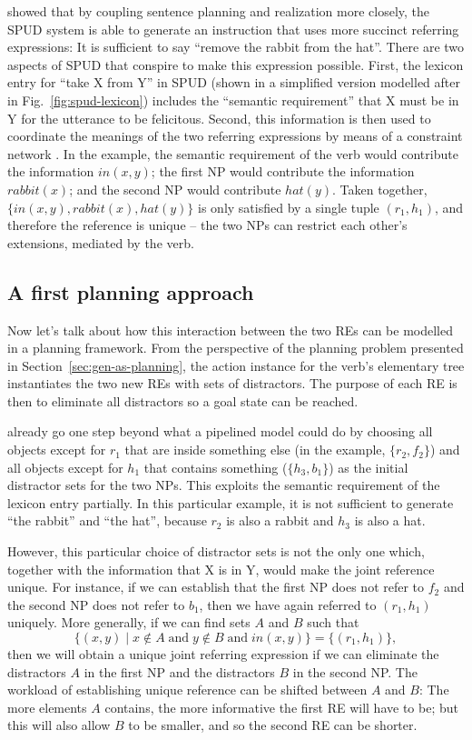  showed that by coupling sentence planning and
realization more closely, the SPUD system is able to generate an
instruction that uses more succinct referring expressions: It is
sufficient to say ``remove the rabbit from the hat''.  There are two
aspects of SPUD that conspire to make this expression possible.
First, the lexicon entry for ``take X from Y'' in SPUD (shown in a
simplified version modelled after  in
Fig.~\ref{fig:spud-lexicon}) includes the ``semantic requirement''
that X must be in Y for the utterance to be felicitous.  Second, this
information is then used to coordinate the meanings of the two
referring expressions by means of a constraint network
\cite{dale91:_gener_refer_expres_invol_relat}.  In the example, the
semantic requirement of the verb would contribute the information
$in(x,y)$; the first NP would contribute the information $rabbit(x)$;
and the second NP would contribute $hat(y)$.  Taken together,
$\{in(x,y), rabbit(x), hat(y)\}$ is only satisfied by a single tuple
$(r_1,h_1)$, and therefore the reference is unique -- the two NPs can
restrict each other's extensions, mediated by the verb.


\subsection{A first planning approach}

Now let's talk about how this interaction between the two REs can be
modelled in a planning framework.  From the perspective of the
planning problem presented in Section~\ref{sec:gen-as-planning}, the
action instance for the verb's elementary tree instantiates the two
new REs with sets of distractors.  The purpose of each RE is then to
eliminate all distractors so a goal state can be reached.

 already go one step beyond what a pipelined model
could do by choosing all objects except for $r_1$ that are inside
something else (in the example, $\{r_2,f_2\}$) and all objects except
for $h_1$ that contains something ($\{h_3,b_1\}$) as the initial
distractor sets for the two NPs.  This exploits the semantic
requirement of the lexicon entry partially.  In this particular
example, it is not sufficient to generate ``the rabbit'' and ``the
hat'', because $r_2$ is also a rabbit and $h_3$ is also a hat.

However, this particular choice of distractor sets is not the only one
which, together with the information that X is in Y, would make the
joint reference unique.  For instance, if we can establish that the
first NP does not refer to $f_2$ and the second NP does not refer to
$b_1$, then we have again referred to $(r_1,h_1)$ uniquely.  More
generally, if we can find sets $A$ and $B$ such that 
$$\{(x,y) \mid x \notin A \;\mbox{and}\; y \notin B \;\mbox{and}\; in(x,y) \}
= \{(r_1,h_1)\},$$ 
then we will obtain a unique joint referring expression if we can
eliminate the distractors $A$ in the first NP and the distractors $B$
in the second NP.  The workload of establishing unique reference can
be shifted between $A$ and $B$: The more elements $A$ contains, the
more informative the first RE will have to be; but this will also
allow $B$ to be smaller, and so the second RE can be shorter.

